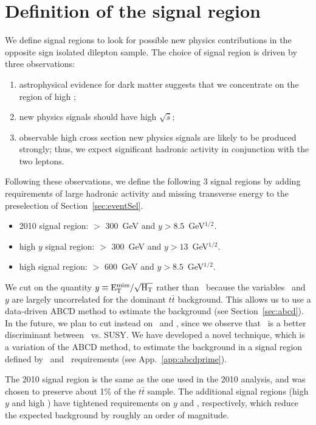 \section{Definition of the signal region}
\label{sec:sigregion}

We define signal regions to look for possible
new physics contributions in the opposite sign isolated 
dilepton sample. The choice of signal region is driven by 
three observations:
\begin{enumerate}
\item astrophysical evidence for dark matter suggests that
we concentrate on the region of high \met;
\item new physics signals should have high $\sqrt{\hat{s}}$;
\item observable high cross section new physics signals 
are likely to be produced strongly;  thus, we expect significant
hadronic activity in conjunction with the two leptons.
\end{enumerate}

Following these observations, we define the following 3 signal regions by 
adding requirements of large hadronic activity and missing transverse energy 
to the preselection of Section~\ref{sec:eventSel}. 
\begin{itemize}
\item 2010 signal region: \Ht $>$ 300~GeV and $y > 8.5$~GeV$^{1/2}$.
\item high $y$ signal region: \Ht $>$ 300~GeV and $y > 13$~GeV$^{1/2}$.
\item high \Ht signal region: \Ht $>$ 600~GeV and $y > 8.5$~GeV$^{1/2}$.
\end{itemize}

We cut on the quantity $y \equiv \rm E_{T}^{miss}/\sqrt{H_T}$ rather than \met\
because the variables \Ht\ and $y$ are
largely uncorrelated for the dominant $t\bar{t}$ background.  
This allows us to use a data-driven ABCD method to estimate the
background (see Section~\ref{sec:abcd}). In the future, we plan to cut instead
on \met\ and \Ht, since we observe that \met\ is a better discriminant between
\ttbar\ vs. SUSY. We have developed a novel technique, which is a variation of 
the ABCD method, to estimate the background in a signal region defined by
\met\ and \Ht\ requirements (see App.~\ref{app:abcdprime}).

The 2010 signal region is the same as the one used in the 2010 analysis, and was
chosen to preserve about 1\% of the $t\bar{t}$ sample.
The additional signal regions (high $y$ and high \Ht) have tightened requirements
on $y$ and \Ht, respectively, which reduce the expected background by roughly
an order of magnitude.

